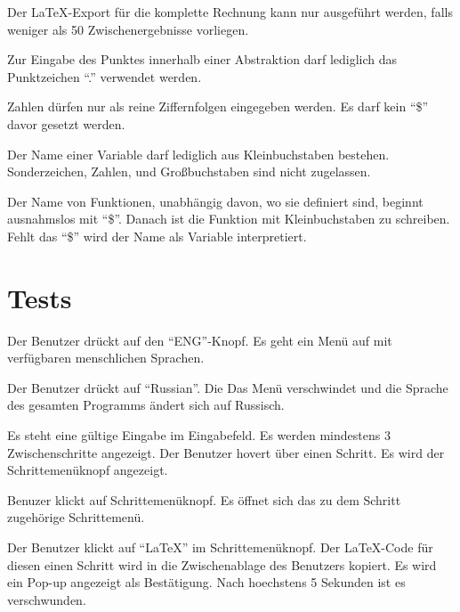 \documentclass[parskip=full,11pt,twoside]{scrartcl}
\begin{document}
Der LaTeX-Export für die komplette Rechnung kann nur ausgeführt werden, falls weniger als 50 Zwischenergebnisse vorliegen.

Zur Eingabe des Punktes innerhalb einer Abstraktion darf lediglich das Punktzeichen \enquote {.} verwendet werden.

Zahlen dürfen nur als reine Ziffernfolgen eingegeben werden. Es darf kein \enquote {\$} davor gesetzt werden.

Der Name einer Variable darf lediglich aus Kleinbuchstaben bestehen. Sonderzeichen, Zahlen, und Großbuchstaben sind nicht zugelassen.

Der Name von Funktionen, unabhängig davon, wo sie definiert sind, beginnt ausnahmslos mit \enquote {\$}. Danach ist die Funktion mit Kleinbuchstaben zu schreiben. Fehlt das \enquote {\$} wird der Name als Variable interpretiert.


\newpage
\section{Tests}

{Der Benutzer drückt auf den \enquote{ENG}-Knopf.}
{Es geht ein Menü auf mit verfügbaren menschlichen Sprachen.}

{Der Benutzer drückt auf \enquote{Russian}.}
{Die Das Menü verschwindet und die Sprache des gesamten Programms ändert sich auf Russisch.}


\teststep
{Es steht eine gültige Eingabe im Eingabefeld.
Es werden mindestens 3 Zwischenschritte angezeigt.}
{Der Benutzer hovert über einen Schritt.}
{Es wird der Schrittemenüknopf angezeigt.}

{Benuzer klickt auf Schrittemenüknopf.}
{Es öffnet sich das zu dem Schritt zugehörige Schrittemenü.}

{Der Benutzer klickt auf \enquote{LaTeX} im Schrittemenüknopf.}
{Der LaTeX-Code für diesen einen Schritt wird in die Zwischenablage des Benutzers kopiert.
Es wird ein Pop-up angezeigt als Bestätigung. Nach hoechstens 5 Sekunden ist es verschwunden.}
\end{document}
